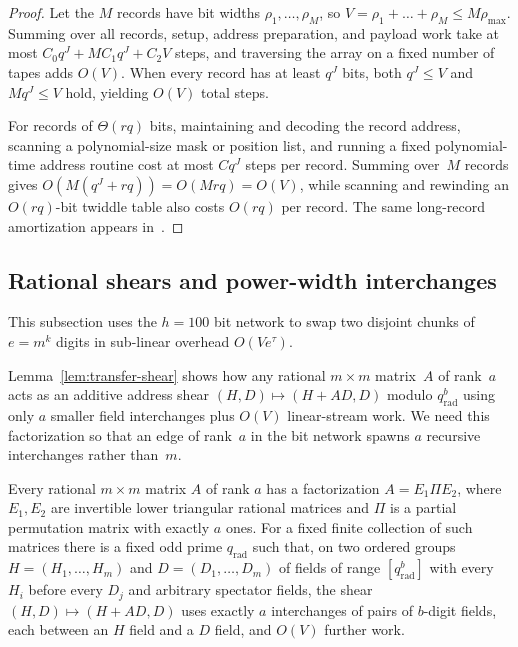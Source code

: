 \begin{proof}
Let the $M$ records have bit widths $\rho_1,\dots,\rho_M$, so $V=\rho_1+\dots+\rho_M\le M\rho_{\max}$. Summing over all records, setup, address preparation, and payload work take at most $C_0q^J+MC_1q^J+C_2V$ steps, and traversing the array on a fixed number of tapes adds $O(V)$. When every record has at least $q^J$ bits, both $q^J\le V$ and $Mq^J\le V$ hold, yielding $O(V)$ total steps.

For records of $\Theta(rq)$ bits, maintaining and decoding the record address, scanning a polynomial-size mask or position list, and running a fixed polynomial-time address routine cost at most $Cq^J$ steps per record. Summing over~$M$ records gives $O(M(q^J+rq))=O(Mrq)=O(V)$, while scanning and rewinding an $O(rq)$-bit twiddle table also costs $O(rq)$ per record. The same long-record amortization appears in~\cite[\S5, p.~26 and \S5.3, pp.~33--34]{OAI26}.
\end{proof}

\subsection{Rational shears and power-width interchanges}\label{sec:transfer-power}

This subsection uses the $h=100$ bit network to swap two disjoint chunks of $e=m^k$ digits in sub-linear overhead $O(V e^\tau)$.

Lemma~\ref{lem:transfer-shear} shows how any rational $m\times m$ matrix~$A$ of rank~$a$ acts as an additive address shear $(H,D)\mapsto(H+AD,D)$ modulo $q_{\mathrm{rad}}^b$ using only $a$ smaller field interchanges plus $O(V)$ linear-stream work. We need this factorization so that an edge of rank~$a$ in the bit network spawns $a$ recursive interchanges rather than~$m$.

\begin{lemma}\label{lem:transfer-shear}
Every rational $m\times m$ matrix $A$ of rank $a$ has a factorization $A=E_1\Pi E_2$, where $E_1,E_2$ are invertible
lower triangular rational matrices and $\Pi$ is a partial permutation matrix with exactly $a$ ones. For a fixed finite
collection of such matrices there is a fixed odd prime $q_{\mathrm{rad}}$ such that, on two ordered groups
$H=(H_1,\dots,H_m)$ and $D=(D_1,\dots,D_m)$ of fields of range $[q_{\mathrm{rad}}^b]$ with every $H_i$ before every
$D_j$ and arbitrary spectator fields, the shear $(H,D)\mapsto(H+AD,D)$ uses exactly $a$ interchanges of pairs of
$b$-digit fields, each between an $H$ field and a $D$ field, and $O(V)$ further work.
\end{lemma}

